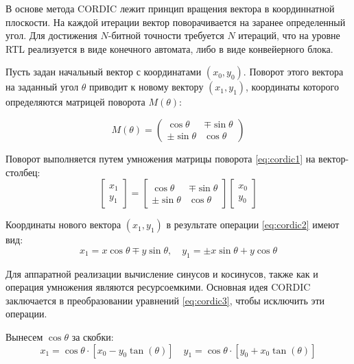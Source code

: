 \documentclass[12pt,a4paper,TimesNewRoman]{article}
\begin{document}
В основе метода CORDIC лежит принцип вращения вектора в координнатной плоскости. На каждой итерации вектор поворачивается на заранее определенный угол. Для достижения $N$-битной точности требуется $N$ итераций, что на уровне RTL реализуется в виде конечного автомата, либо в виде конвейерного блока.

Пусть задан начальный вектор с координатами $(x_0, y_0)$. Поворот этого вектора на заданный угол $\theta$ приводит к новому вектору $(x_1, y_1)$, координаты которого определяются матрицей поворота $M(\theta)$:

\begin{equation} \label{eq:cordic1}
    M(\theta) =
    \begin{pmatrix}
        \cos\theta & \mp \sin\theta \\
        \pm \sin\theta & \cos \theta
    \end{pmatrix}
\end{equation}

Поворот выполняется путем умножения матрицы поворота \eqref{eq:cordic1} на вектор-столбец:
\begin{equation} \label{eq:cordic2}
    \begin{bmatrix}
        x_1 \\
        y_1
    \end{bmatrix} =
    \begin{bmatrix}
        \cos\theta & \mp \sin\theta \\
        \pm \sin\theta & \cos \theta
    \end{bmatrix}
    \begin{bmatrix}
        x_0 \\
        y_0
    \end{bmatrix}
\end{equation}

Координаты нового вектора $(x_1, y_1)$ в результате операции \eqref{eq:cordic2} имеют вид:
\begin{equation}\label{eq:cordic3}
    x_1 = x\cos\theta \mp y\sin\theta, \quad
    y_1 = \pm x\sin\theta + y\cos\theta
\end{equation}

Для аппаратной реализации вычисление синусов и косинусов, также как и операция умножения являются ресурсоемкими. Основная идея CORDIC заключается в преобразовании уравнений \eqref{eq:cordic3}, чтобы исключить эти операции.

Вынесем $\cos\theta$ за скобки:
\begin{equation} \label{eq:cordic4}
    x_1 = \cos\theta \cdot \left[x_0-y_0\tan(\theta)\right] \quad
    y_1 = \cos\theta \cdot \left[y_0+x_0\tan(\theta)\right]
\end{equation}
\end{document}
